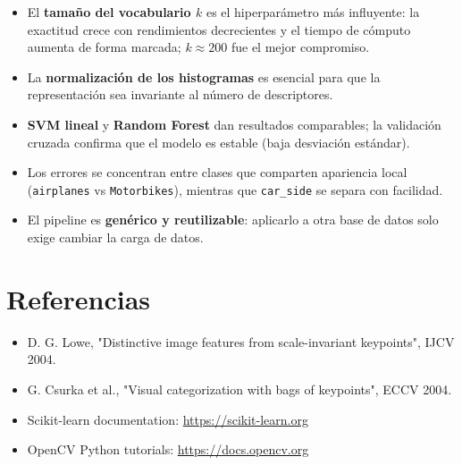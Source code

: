 \documentclass{article}
\begin{document}
\begin{itemize}
    \item El \textbf{tamaño del vocabulario $k$} es el hiperparámetro más influyente: la
    exactitud crece con rendimientos decrecientes y el tiempo de cómputo aumenta de forma
    marcada; $k \approx 200$ fue el mejor compromiso.
    \item La \textbf{normalización de los histogramas} es esencial para que la
    representación sea invariante al número de descriptores.
    \item \textbf{SVM lineal} y \textbf{Random Forest} dan resultados comparables; la
    validación cruzada confirma que el modelo es estable (baja desviación estándar).
    \item Los errores se concentran entre clases que comparten apariencia local
    (\texttt{airplanes} vs \texttt{Motorbikes}), mientras que \texttt{car\_side} se separa
    con facilidad.
    \item El pipeline es \textbf{genérico y reutilizable}: aplicarlo a otra base de datos
    solo exige cambiar la carga de datos.
\end{itemize}

\section{Referencias}

    \begin{itemize}
    \item D. G. Lowe, "Distinctive image features from scale-invariant keypoints", IJCV 2004.
    \item G. Csurka et al., "Visual categorization with bags of keypoints", ECCV 2004.
    \item Scikit-learn documentation: \url{https://scikit-learn.org}
    \item OpenCV Python tutorials: \url{https://docs.opencv.org}


    \end{itemize}

\end{document}
